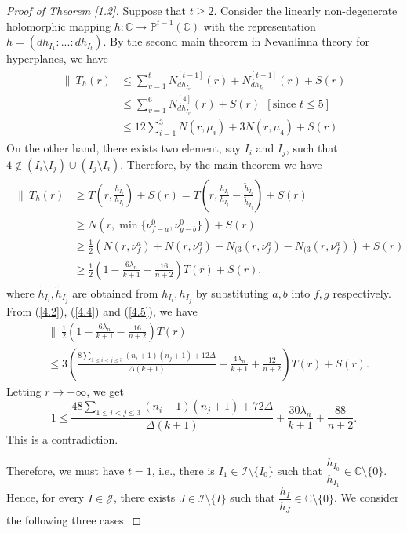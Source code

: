\documentclass[12pt,leqno]{amsart}
\newcommand{\C}{{\mathbb{C}}}
\renewcommand{\P}{{\mathbb{P}}}
\numberwithin{equation}{section}
\begin{document}
\begin{proof}[Proof of Theorem \ref{1.2}]
Suppose that $t\ge 2$. Consider the linearly non-degenerate holomorphic mapping $h:\C \to \P^{t-1}(\C)$ with the representation $h=(d h_{I_1}:...:d h_{I_t})$. By the second main theorem in Nevanlinna theory for hyperplanes, we have
\begin{align}\label{4.4}
\begin{split}
\|\ T_h(r)&\le \sum_{v=1}^t N^{[t-1]}_{dh_{I_v}}(r)+N_{dh_{I_0}}^{[t-1]}(r)+S(r)\\
&\le \sum_{v=1}^6 N^{[4]}_{dh_{I_v}}(r)+S(r)\ \  [\text{since $t\le 5$}]\\
&\le 12\sum_{i=1}^3N(r,\mu_i)+3N(r,\mu_4)+S(r).
\end{split}
\end{align}
On the other hand, there exists two element, say $I_i$ and $I_j$, such that $4\not\in (I_i\setminus I_j)\cup (I_j\setminus I_i)$. Therefore, by the main theorem we have
\begin{align}\label{4.5}
\begin{split}
\|\ T_h(r)&\ge T(r,\frac{h_{I_i}}{h_{I_j}})+S(r)=T(r,\frac{h_{I_i}}{h_{I_j}}-\frac{\tilde h_{I_i}}{\tilde h_{I_j}})+S(r)\\
&\ge N(r,\min\{\nu^0_{f-a},\nu^0_{g-b}\})+S(r)\\
&\ge \frac{1}{2}\left(N(r,\nu^a_{f})+N(r,\nu^a_{f})-N_{(3}(r,\nu^a_{f})-N_{(3}(r,\nu^a_{f})\right)+S(r)\\
&\ge \frac{1}{2}\left(1-\frac{6\lambda_n}{k+1}-\frac{16}{n+2}\right)T(r)+S(r),
\end{split}
\end{align}
where $\tilde h_{I_i},\tilde h_{I_j}$ are obtained from $h_{I_i},h_{I_j}$ by substituting $a,b$ into $f,g$ respectively.
From (\ref{4.2}), (\ref{4.4}) and (\ref{4.5}), we have
\begin{align*}
&\biggl\|\  \frac{1}{2}\left(1-\frac{6\lambda_n}{k+1}-\frac{16}{n+2}\right)T(r)\\ 
& \le 3\left(\frac{8\sum_{1\le i<j\le 3}(n_i+1)(n_j+1)+12\Delta}{\Delta(k+1)}+\frac{4\lambda_n}{k+1}+\frac{12}{n+2}\right)T(r)+S(r).
\end{align*}
Letting $r\longrightarrow +\infty$, we get 
$$1\le \frac{48\sum_{1\le i<j\le 3}(n_i+1)(n_j+1)+72\Delta}{\Delta(k+1)}+\frac{30\lambda_n}{k+1}+\frac{88}{n+2}.$$
This is a contradiction.

Therefore, we must have $t=1$, i.e., there is $I_1\in \mathcal {I}\setminus \{I_0\}$ such that  $\dfrac {h_{I_0}}{h_{I_1}}\in\C\setminus\{0\}$. Hence, for every $I\in\mathcal J$, there exists $J\in\mathcal I\setminus\{I\}$ such that $\dfrac{h_I}{h_J}\in\C\setminus\{0\}$. We consider the following three cases:


\end{proof}
\end{document}
